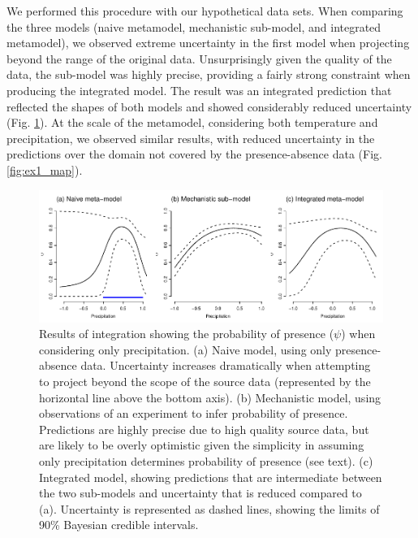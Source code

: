We performed this procedure with our hypothetical data sets.
When comparing the three models (naive metamodel, mechanistic sub-model, and integrated metamodel), we observed extreme uncertainty in the first model when projecting beyond the range of the original data.
Unsurprisingly given the quality of the data, the sub-model was highly precise, providing a fairly strong constraint when producing the integrated model.
The result was an integrated prediction that reflected the shapes of both models and showed considerably reduced uncertainty (Fig. \ref{fig:ex1_precip}).
At the scale of the metamodel, considering both temperature and precipitation, we observed similar results, with reduced uncertainty in the predictions over the domain not covered by the presence-absence data (Fig. \ref{fig:ex1_map}).



\begin{figure}[tb]
	\includegraphics{ex1_precip.pdf}
	\caption{Results of integration showing the probability of presence (\(\psi\)) when considering only precipitation.
	(a) Naive model, using only presence-absence data. Uncertainty increases dramatically when attempting to project beyond the scope of the source data (represented by the horizontal line above the bottom axis).
	(b) Mechanistic model, using observations of an experiment to infer probability of presence. Predictions are highly precise due to high quality source data, but are likely to be overly optimistic given the simplicity in assuming only precipitation determines probability of presence (see text).
	(c) Integrated model, showing predictions that are intermediate between the two sub-models and uncertainty that is reduced compared to (a).
	Uncertainty is represented as dashed lines, showing the limits of 90\% Bayesian credible intervals.}
	\label{fig:ex1_precip}
\end{figure}



